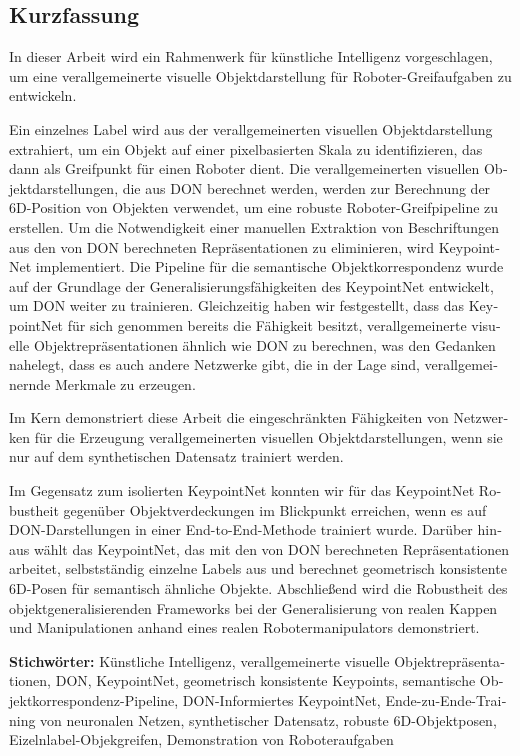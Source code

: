 \cleardoublepage

\begin{otherlanguage}{ngerman}
    \chapter*{Kurzfassung}

    In dieser Arbeit wird ein Rahmenwerk für künstliche Intelligenz vorgeschlagen, um eine verallgemeinerte visuelle Objektdarstellung für Roboter-Greifaufgaben zu entwickeln.

    Ein einzelnes Label wird aus der verallgemeinerten visuellen Objektdarstellung extrahiert, um ein Objekt auf einer pixelbasierten Skala zu identifizieren, das dann als Greifpunkt für einen Roboter dient. Die verallgemeinerten visuellen Objektdarstellungen, die aus \ac{DON} berechnet werden, werden zur Berechnung der 6D-Position von Objekten verwendet, um eine robuste Roboter-Greifpipeline zu erstellen. Um die Notwendigkeit einer manuellen Extraktion von Beschriftungen aus den von \ac{DON} berechneten Repräsentationen zu eliminieren, wird KeypointNet implementiert. Die Pipeline für die semantische Objektkorrespondenz wurde auf der Grundlage der Generalisierungsfähigkeiten des KeypointNet entwickelt, um \ac{DON} weiter zu trainieren. Gleichzeitig haben wir festgestellt, dass das KeypointNet für sich genommen bereits die Fähigkeit besitzt, verallgemeinerte visuelle Objektrepräsentationen ähnlich wie \ac{DON} zu berechnen, was den Gedanken nahelegt, dass es auch andere Netzwerke gibt, die in der Lage sind, verallgemeinernde Merkmale zu erzeugen.


    Im Kern demonstriert diese Arbeit die eingeschränkten Fähigkeiten von Netzwerken für die Erzeugung verallgemeinerten visuellen Objektdarstellungen, wenn sie nur auf dem synthetischen Datensatz trainiert werden.

    Im Gegensatz zum isolierten KeypointNet konnten wir für das KeypointNet Robustheit gegenüber Objektverdeckungen im Blickpunkt erreichen, wenn es auf \ac{DON}-Darstellungen in einer End-to-End-Methode trainiert wurde. Darüber hinaus wählt das KeypointNet, das mit den von \ac{DON} berechneten Repräsentationen arbeitet, selbstständig einzelne Labels aus und berechnet geometrisch konsistente 6D-Posen für semantisch ähnliche Objekte. Abschließend wird die Robustheit des objektgeneralisierenden Frameworks bei der Generalisierung von realen Kappen und Manipulationen anhand eines realen Robotermanipulators demonstriert.

    \vfill
    \noindent\textbf{Stichwörter:} Künstliche Intelligenz, verallgemeinerte visuelle Objektrepräsentationen, \ac{DON}, KeypointNet,
    geometrisch konsistente Keypoints, semantische Objektkorrespondenz-Pipeline,
    \ac{DON}-Informiertes KeypointNet, Ende-zu-Ende-Training von neuronalen Netzen, synthetischer Datensatz,
    robuste 6D-Objektposen, Eizelnlabel-Objekgreifen, Demonstration von Roboteraufgaben
    \vfill
\end{otherlanguage}
